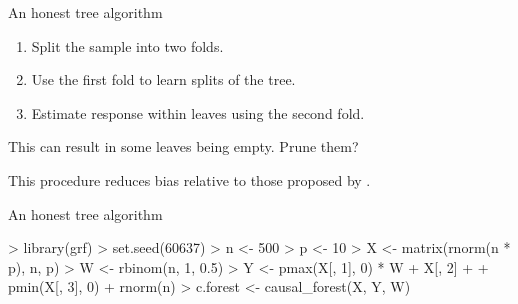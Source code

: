\documentclass[xcolor={table}, handout]{beamer}
\begin{document}
\begin{frame}{An honest tree algorithm}

\begin{enumerate}
\item Split the sample into two folds. \pause
\item Use the first fold to learn splits of the tree. \pause
\item Estimate response within leaves using the second fold. \pause
\end{enumerate}

\begin{wideitemize}
\item This can result in some leaves being empty. \pause Prune them? \pause
\item This procedure reduces bias relative to those proposed by \cite{breiman2001random}.
\end{wideitemize}

\end{frame}



\begin{frame}[fragile]{An honest tree algorithm}

\begin{Schunk}
\begin{Sinput}
> library(grf)
> set.seed(60637)
> n <- 500
> p <- 10
> X <- matrix(rnorm(n * p), n, p)
> W <- rbinom(n, 1, 0.5)
> Y <- pmax(X[, 1], 0) * W + X[, 2] +
+   pmin(X[, 3], 0) + rnorm(n)
> c.forest <- causal_forest(X, Y, W)
\end{Sinput}
\end{Schunk}



\end{frame}


\end{document}
